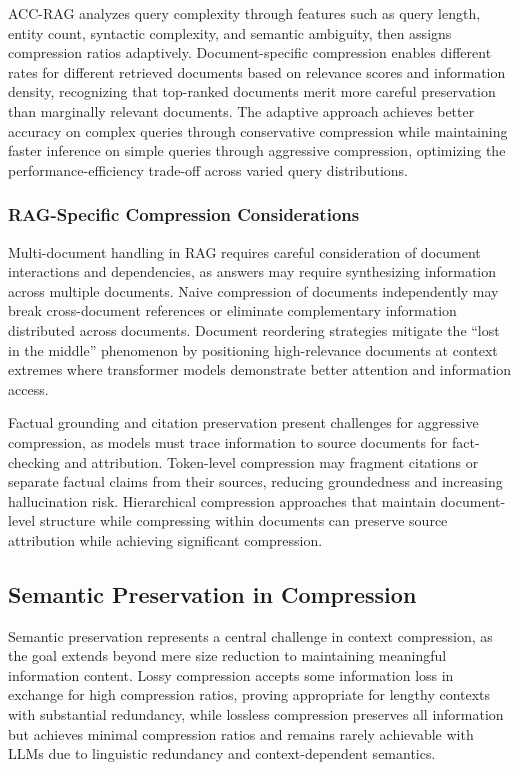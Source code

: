 ACC-RAG analyzes query complexity through features such as query length, entity count, syntactic complexity, and semantic ambiguity, then assigns compression ratios adaptively. Document-specific compression enables different rates for different retrieved documents based on relevance scores and information density, recognizing that top-ranked documents merit more careful preservation than marginally relevant documents. The adaptive approach achieves better accuracy on complex queries through conservative compression while maintaining faster inference on simple queries through aggressive compression, optimizing the performance-efficiency trade-off across varied query distributions.

\subsubsection{RAG-Specific Compression Considerations}

Multi-document handling in RAG requires careful consideration of document interactions and dependencies, as answers may require synthesizing information across multiple documents. Naive compression of documents independently may break cross-document references or eliminate complementary information distributed across documents. Document reordering strategies mitigate the ``lost in the middle'' phenomenon by positioning high-relevance documents at context extremes where transformer models demonstrate better attention and information access.

Factual grounding and citation preservation present challenges for aggressive compression, as models must trace information to source documents for fact-checking and attribution. Token-level compression may fragment citations or separate factual claims from their sources, reducing groundedness and increasing hallucination risk. Hierarchical compression approaches that maintain document-level structure while compressing within documents can preserve source attribution while achieving significant compression.

\subsection{Semantic Preservation in Compression}

Semantic preservation represents a central challenge in context compression, as the goal extends beyond mere size reduction to maintaining meaningful information content. Lossy compression accepts some information loss in exchange for high compression ratios, proving appropriate for lengthy contexts with substantial redundancy, while lossless compression preserves all information but achieves minimal compression ratios and remains rarely achievable with LLMs due to linguistic redundancy and context-dependent semantics.

